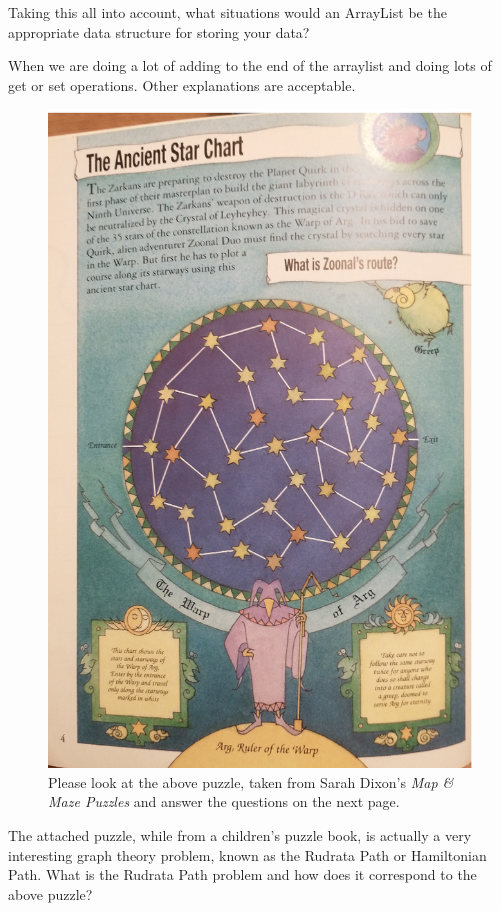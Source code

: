 \documentclass[letter,answers,addpoints]{exam}
\begin{document}
\begin{questions}
		\question[4] Taking this all into account, what situations would an ArrayList be the appropriate data structure for storing your data?
		\begin{solution}[\stretch{1}]
		When we are doing a lot of adding to the end of the arraylist	 and doing lots of get or set operations.   Other explanations are acceptable.
		\end{solution}
		
\newpage

\begin{figure}[h!]
	\centering
	\includegraphics[width=0.7\linewidth]{starchart}
	\caption[Please look at the above puzzle, taken from Sarah Dixon’s \textit{Map \& Maze Puzzles} and answer the questions on the next page.]{Please look at the above puzzle, taken from Sarah Dixon's \textit{Map \& Maze Puzzles }and answer the questions on the next page.}
	\label{fig:starchart}
\end{figure}

\newpage
	
\question[10] 
The attached puzzle, while from a children’s puzzle book, is actually a very interesting graph
theory problem, known as the Rudrata Path or Hamiltonian Path. What is the Rudrata Path problem
and how does it correspond to the above puzzle?


\end{questions}
\end{document}
